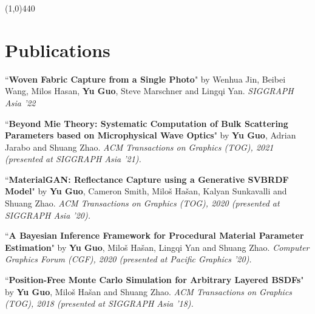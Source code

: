 \documentclass[margin,line]{resume}
\begin{document}
\begin{resume}
	\vspace{-5.0mm}
	\line(1,0){440}
	\vspace{-5.0mm}
	
	\section{\mysidestyle Publications}
	
	``\textbf{Woven Fabric Capture from a Single Photo}" 
	by Wenhua Jin, Beibei Wang, Milos Hasan, \textbf{Yu Guo}, Steve Marschner and Lingqi Yan. 
	\textsl{SIGGRAPH Asia '22}\\
	
	\vspace{-5mm}
	
	``\textbf{Beyond Mie Theory: Systematic Computation of Bulk Scattering Parameters based on Microphysical Wave Optics}" 
	by \textbf{Yu Guo}, Adrian Jarabo and Shuang Zhao. 
	\textsl{ACM Transactions on Graphics (TOG), 2021 (presented at SIGGRAPH Asia '21).}\\
	
	\vspace{-5mm}
	
	``\textbf{MaterialGAN: Reflectance Capture using a Generative SVBRDF Model}" 
	by \textbf{Yu Guo}, Cameron Smith, Milo\v{s} Ha\v{s}an, Kalyan Sunkavalli and Shuang Zhao. 
	\textsl{ACM Transactions on Graphics (TOG), 2020 (presented at SIGGRAPH Asia '20).}\\
	
	\vspace{-5mm}
	
	``\textbf{A Bayesian Inference Framework for Procedural Material Parameter Estimation}" 
	by \textbf{Yu Guo}, Milo\v{s} Ha\v{s}an, Lingqi Yan and Shuang Zhao. 
	\textsl{Computer Graphics Forum (CGF), 2020 (presented at Pacific Graphics '20).}\\
	
	\vspace{-5mm}
	
	``\textbf{Position-Free Monte Carlo Simulation for Arbitrary Layered BSDFs}" 
	by \textbf{Yu Guo}, Milo\v{s} Ha\v{s}an and Shuang Zhao. 
	\textsl{ACM Transactions on Graphics (TOG), 2018 (presented at SIGGRAPH Asia '18).}\\
	
	\vspace{-5mm}
	

\end{resume}
\end{document}
